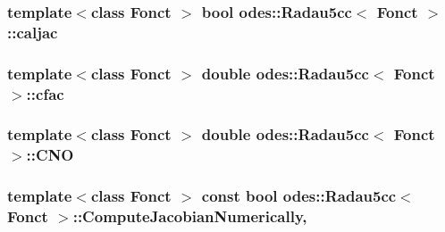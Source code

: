 \hypertarget{classodes_1_1Radau5cc_a774b282697116ae2f25f6d2fdce9410c}{
\subsubsection[{caljac}]{\setlength{\rightskip}{0pt plus 5cm}template$<$class Fonct $>$ bool {\bf odes\-::\-Radau5cc}$<$ Fonct $>$\-::caljac\hspace{0.3cm}{\ttfamily [private]}}}\label{classodes_1_1Radau5cc_a774b282697116ae2f25f6d2fdce9410c}
\hypertarget{classodes_1_1Radau5cc_afa383ebf8974ba3aac8841b6a4b43afa}{
\subsubsection[{cfac}]{\setlength{\rightskip}{0pt plus 5cm}template$<$class Fonct $>$ double {\bf odes\-::\-Radau5cc}$<$ Fonct $>$\-::cfac\hspace{0.3cm}{\ttfamily [private]}}}\label{classodes_1_1Radau5cc_afa383ebf8974ba3aac8841b6a4b43afa}
\hypertarget{classodes_1_1Radau5cc_aaa49f4e7f5289a7012e2ce29d2a7dab8}{
\subsubsection[{C\-N\-O}]{\setlength{\rightskip}{0pt plus 5cm}template$<$class Fonct $>$ double {\bf odes\-::\-Radau5cc}$<$ Fonct $>$\-::C\-N\-O\hspace{0.3cm}{\ttfamily [private]}}}\label{classodes_1_1Radau5cc_aaa49f4e7f5289a7012e2ce29d2a7dab8}
\hypertarget{classodes_1_1Radau5cc_a742c490578cf9e4dcf692e6706c2ec90}{
\subsubsection[{Compute\-Jacobian\-Numerically}]{\setlength{\rightskip}{0pt plus 5cm}template$<$class Fonct $>$ const bool {\bf odes\-::\-Radau5cc}$<$ Fonct $>$\-::Compute\-Jacobian\-Numerically\hspace{0.3cm}{\ttfamily [static]}, {\ttfamily [private]}}}\label{classodes_1_1Radau5cc_a742c490578cf9e4dcf692e6706c2ec90}

